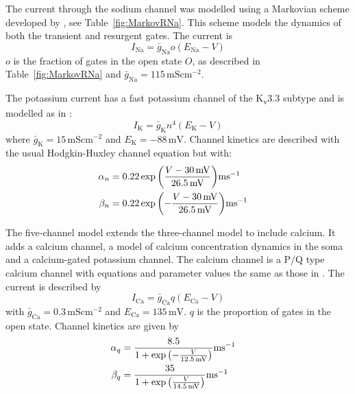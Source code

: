 \documentclass[utf8]{frontiersSCNS} %
\newcommand{\mv}{\,\mathrm{mV}}
\newcommand{\msi}{\,\mathrm{mS cm^{-2}}}
\renewcommand{\k}{\mathrm{K}}
\newcommand{\ca}{\mathrm{Ca}}
\newcommand{\na}{\mathrm{Na}}
\begin{document}
The current through the sodium channel was modelled using a Markovian scheme developed by \cite{RamanBean2001}, see
Table~\ref{fig:MarkovRNa}. This scheme models the dynamics of both the transient and resurgent gates. The current is
\begin{equation}
\label{eq:I_RNa}
I_{\na} = \bar{g}_\na o (E_\na-V)
\end{equation}
$o$ is the fraction of gates in the open state $O$, as described in Table~\ref{fig:MarkovRNa} and $\bar{g}_\na=115\msi$.


The potassium current has a fast potassium channel of the K\textsubscript{v}3.3 subtype and is modelled as in
\cite{MasoliEtAl2015}:
\begin{equation}
\label{eq:I_K}
I_{\k} = \bar{g}_{\k} n^4(E_{\k}-V)
\end{equation}
where $\bar{g}_{\k}= 15\msi$ and $E_{\k}=-88\mv$. Channel kinetics are described with the usual Hodgkin-Huxley channel equation but with:
\begin{align}
\label{eq:n_kinetics}
\alpha_{n} &= 0.22
\exp{\left(\frac{V-30\mv}{26.5\mv}\right)}\mathrm{ms}^{-1}\cr 
\beta_{n} &= 0.22
\exp{\left(-\frac{V-30\mv}{26.5\mv}\right)}\mathrm{ms}^{-1}
\end{align}

The five-channel model extends the three-channel model to include calcium. It adds a calcium
channel, a model of calcium concentration dynamics in the soma and a calcium-gated potassium channel. The calcium channel is a P/Q type calcium channel with equations and parameter values the same as those in
\cite{MiyashoEtAl2001}. The current is described by
\begin{equation}
\label{eq:I_Ca}
I_\ca =\bar{g}_{\ca} q(E_\ca-V)
\end{equation}
with $\bar{g}_\ca= 0.3\msi$ and $E_\ca = 135\mv$. $q$ is the proportion of gates in the open state. Channel kinetics are given by
\begin{align}
\label{eq:q_kinetics}
\alpha_{q} &= \frac{8.5}{ 1 +
  \exp{\left(-\frac{V}{12.5\mv}\right)}}\mathrm{ms}^{-1}\cr \beta_{q} &=
\frac{35}{ 1 + \exp{\left(\frac{V}{14.5\mv}\right)}}\mathrm{ms}^{-1}
\end{align}

\end{document}
